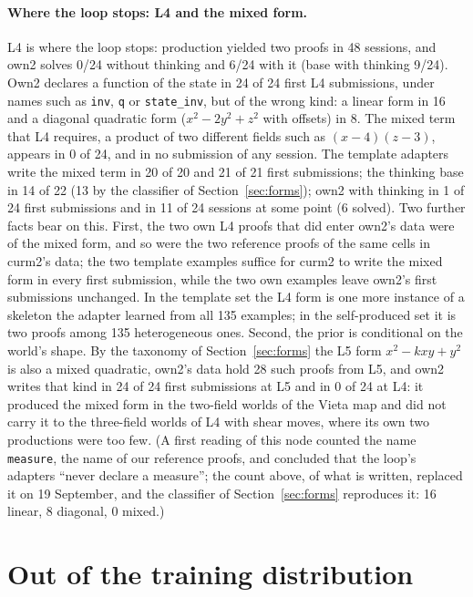 \documentclass[11pt]{article}
\begin{document}
\paragraph{Where the loop stops: L4 and the mixed form.} L4 is where the
loop stops: production yielded two proofs in 48 sessions, and own2 solves
0/24 without thinking and 6/24 with it (base with thinking 9/24). Own2
declares a function of the state in 24 of 24 first L4 submissions, under
names such as \texttt{inv}, \texttt{q} or \texttt{state\_inv}, but of the
wrong kind: a linear form in 16 and a diagonal quadratic form
($x^2-2y^2+z^2$ with offsets) in 8. The mixed term that L4 requires, a
product of two different fields such as $(x-4)(z-3)$, appears in 0 of 24,
and in no submission of any session. The template adapters write the
mixed term in 20 of 20 and 21 of 21 first submissions; the thinking base
in 14 of 22 (13 by the classifier of Section~\ref{sec:forms}); own2 with thinking in 1 of 24 first submissions and in 11 of
24 sessions at some point (6 solved). Two further facts bear on this. First, the
two own L4 proofs that did enter own2's data were of the mixed form, and
so were the two reference proofs of the same cells in curm2's data; the two template examples suffice for curm2 to write the mixed form in every first submission, while the two own examples leave own2's first submissions unchanged. In the template set
the L4 form is one more instance of a skeleton the adapter learned from
all 135 examples; in the self-produced set it is two proofs among 135
heterogeneous ones. Second, the prior is conditional on the world's
shape. By the taxonomy of Section~\ref{sec:forms} the L5 form
$x^2-kxy+y^2$ is also a mixed quadratic, own2's data hold 28 such proofs
from L5, and own2 writes that kind in 24 of 24 first submissions at L5 and
in 0 of 24 at L4: it produced the mixed form in the two-field worlds of
the Vieta map and did not carry it to the three-field worlds of L4 with
shear moves, where its own two productions were too few. (A first reading
of this node counted the name \texttt{measure}, the name of our reference
proofs, and concluded that the loop's adapters ``never declare a
measure''; the count above, of what is written, replaced it on 19
September, and the classifier of Section~\ref{sec:forms} reproduces it:
16 linear, 8 diagonal, 0 mixed.)

\section{Out of the training distribution}
\label{sec:walls}
\end{document}
